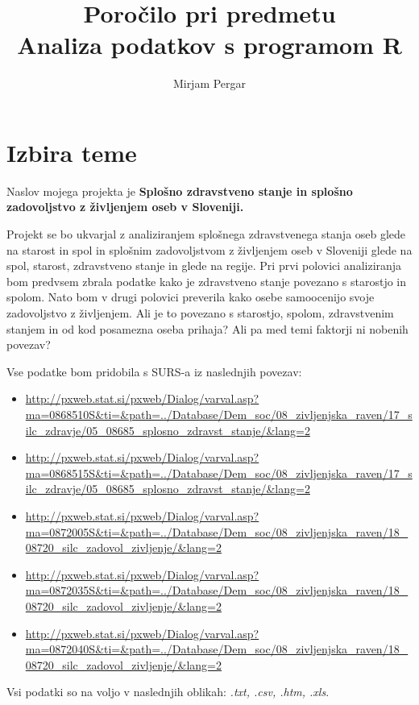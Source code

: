 \documentclass[11pt,a4paper]{article}
\begin{document}
\title{Poročilo pri predmetu \\
Analiza podatkov s programom R\\}

\author{Mirjam Pergar}
\clearpage\maketitle
\thispagestyle{empty}



\section{Izbira teme}

Naslov mojega projekta je \large\textbf{Splošno zdravstveno stanje in splošno zadovoljstvo z življenjem oseb v Sloveniji.}

Projekt se bo ukvarjal z analiziranjem splošnega zdravstvenega stanja oseb glede na starost in spol in splošnim zadovoljstvom z življenjem oseb v Sloveniji glede na spol, starost, zdravstveno stanje in glede na regije. Pri prvi polovici analiziranja bom predvsem zbrala podatke kako je zdravstveno stanje povezano s starostjo in spolom. Nato bom v drugi polovici preverila kako osebe samoocenijo svoje zadovoljstvo z življenjem. Ali je to povezano s starostjo, spolom, zdravstvenim stanjem in od kod posamezna oseba prihaja? Ali pa med temi faktorji ni nobenih povezav?

Vse podatke bom pridobila s SURS-a iz naslednjih povezav:

\begin{itemize} 
\item \url{http://pxweb.stat.si/pxweb/Dialog/varval.asp?ma=0868510S\&ti=\&path=../Database/Dem\_soc/08\_zivljenjska\_raven/17\_silc\_zdravje/05\_08685\_splosno\_zdravst\_stanje/\&lang=2}

\item  \url{http://pxweb.stat.si/pxweb/Dialog/varval.asp?ma=0868515S\&ti=\&path=../Database/Dem\_soc/08\_zivljenjska\_raven/17\_silc\_zdravje/05\_08685\_splosno\_zdravst\_stanje/\&lang=2}

\item \url{http://pxweb.stat.si/pxweb/Dialog/varval.asp?ma=0872005S\&ti=\&path=../Database/Dem\_soc/08\_zivljenjska\_raven/18\_08720\_silc\_zadovol\_zivljenje/\&lang=2}

\item \url{http://pxweb.stat.si/pxweb/Dialog/varval.asp?ma=0872035S\&ti=\&path=../Database/Dem\_soc/08\_zivljenjska\_raven/18\_08720\_silc\_zadovol\_zivljenje/\&lang=2}

\item  \url{http://pxweb.stat.si/pxweb/Dialog/varval.asp?ma=0872040S\&ti=\&path=../Database/Dem\_soc/08\_zivljenjska\_raven/18\_08720\_silc\_zadovol\_zivljenje/\&lang=2}
\end{itemize}
Vsi podatki so na voljo v naslednjih oblikah: \textit{.txt, .csv, .htm, .xls}.
\end{document}
